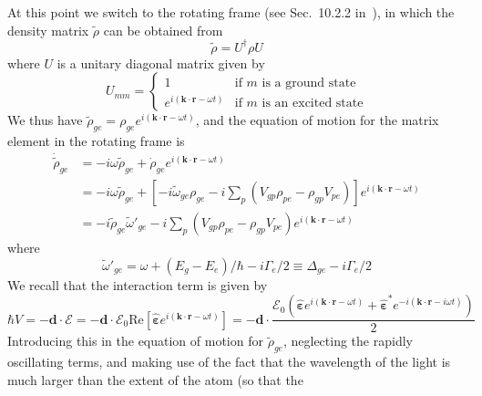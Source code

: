 \documentclass[11pt,letter]{article}
\newcommand{\bv}[1]{\ensuremath{\bm{#1}}}
\newcommand{\efield}{\ensuremath{\bv{\mathcal{E}}}}
\newcommand{\efieldo}{\ensuremath{\mathcal{E}_{0}}}
\newcommand{\epspol}{\ensuremath{\hat{\bv{\varepsilon}}}}
\begin{document}
At this point we switch to the rotating frame (see Sec.~10.2.2
in~\cite{auzinsh2010optically}), in which the density matrix $\tilde{\rho}$ can
be obtained from
\begin{equation}
 \tilde{\rho} = U^{\dagger} \rho U
\end{equation} 
where $U$ is a unitary diagonal matrix given by 
\begin{equation} 
  U_{mm} = \begin{cases} 
   1 & \text{if  $m$ is a ground state} \\
   e^{i(\bv{k}\cdot\bv{r}-\omega t)} & \text{if $m$ is an excited state} 
  \end{cases}
\end{equation}
We thus have $\tilde{\rho}_{ge} = \rho_{ge} e^{i(\bv{k}\cdot\bv{r}-\omega t)}$, and the equation
of motion for the matrix element in the rotating frame is
\begin{equation}
\begin{split}
  \dot{\tilde{\rho}}_{ge} & = 
     -i\omega \tilde{\rho}_{ge} + \dot{\rho}_{ge} e^{i(\bv{k}\cdot\bv{r}-\omega t)} \\
     &  =  
     -i\omega \tilde{\rho}_{ge} + 
      \left[ 
     -i \tilde{\omega}_{ge}  \rho_{ge}  
     -i \sum_{p}\left( V_{gp} \rho_{pe} - \rho_{gp}V_{pe} \right) 
      \right] e^{i(\bv{k}\cdot\bv{r}-\omega t)}  \\ 
     &  =  
     -i \tilde{\rho}_{ge}\tilde{\omega}'_{ge}   
     -i \sum_{p}\left( V_{gp} \rho_{pe} - \rho_{gp}V_{pe}\right)  e^{i(\bv{k}\cdot\bv{r}-\omega t)}   
\end{split} 
\end{equation}
where 
\begin{equation}
  \tilde{\omega}'_{ge} = \omega + (E_{g} - E_{e})/\hbar - i \Gamma_{e}/2 
   \equiv  \Delta_{ge} - i \Gamma_{e}/2 
\end{equation}
We recall that the interaction term is given by 
\begin{equation} 
  \hbar V = -\bv{d} \cdot \efield 
    =  -\bv{d} \cdot \efieldo \text{Re}[ \epspol e^{i(\bv{k}\cdot\bv{r} - \omega t )} ]
    =  -\bv{d} \cdot \frac{  \efieldo ( \epspol e^{i(\bv{k}\cdot\bv{r} - \omega t)} 
                             + \epspol^{*} e^{-i(\bv{k}\cdot\bv{r}-i\omega t)} )}{2}  \end{equation}
Introducing this in the equation of motion for $\tilde{\rho}_{ge}$, 
neglecting the rapidly oscillating terms, and making use of the fact that the
wavelength of the light is much larger than the extent of the atom (so that the
\end{document}
